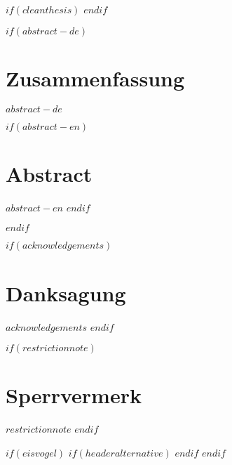 
$if(cleanthesis)$
\clearpage
\customtitlebackpage
$endif$



$if(abstract-de)$
\cleardoublepage
\begin{minipage}{\linewidth}

\chapter*{Zusammenfassung}
$abstract-de$

$if(abstract-en)$
\chapter*{Abstract}
$abstract-en$
$endif$

\end{minipage}
\cleardoublepage
$endif$



$if(acknowledgements)$
\chapter*{Danksagung}
$acknowledgements$
$endif$



$if(restrictionnote)$
\chapter*{Sperrvermerk}
$restrictionnote$
$endif$
\printnoidxglossaries
\cleardoublepage



$if(eisvogel)$
$if(headeralternative)$
    \pagestyle{headeralternative}
$endif$
$endif$
